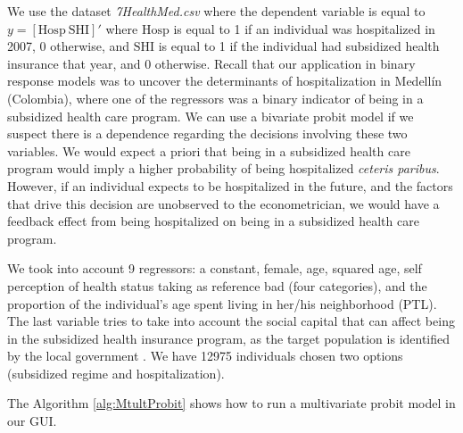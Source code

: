 We use the dataset \textit{7HealthMed.csv} where the dependent variable is equal to $y = \left[\text{Hosp} \ \text{SHI}\right]'$ where $\text{Hosp}$ is equal to 1 if an individual was hospitalized in 2007, 0 otherwise, and $\text{SHI}$ is equal to 1 if the individual had subsidized health insurance that year, and 0 otherwise.
Recall that our application in binary response models was to uncover the determinants of hospitalization in Medell\'in (Colombia), where one of the regressors was a binary indicator of being in a subsidized health care program.
We can use a bivariate probit model if we suspect there is a dependence regarding the decisions involving these two variables.
We would expect a priori that being in a subsidized health care program would imply a higher probability of being hospitalized \textit{ceteris paribus}.
However, if an individual expects to be hospitalized in the future, and the factors that drive this decision are unobserved to the econometrician, we would have a feedback effect from being hospitalized on being in a subsidized health care program.

We took into account 9 regressors: a constant, female, age, squared age, self perception of health status taking as reference bad (four categories), and the proportion of the individual's age spent living in her/his neighborhood (PTL). 
The last variable tries to take into account the social capital that can affect being in the subsidized health insurance program, as the target population is identified by the local government \cite{Ramirez2019a}. We have 12975 individuals chosen two options (subsidized regime and hospitalization).

The Algorithm \ref{alg:MtultProbit} shows how to run a multivariate probit model in our GUI. 

